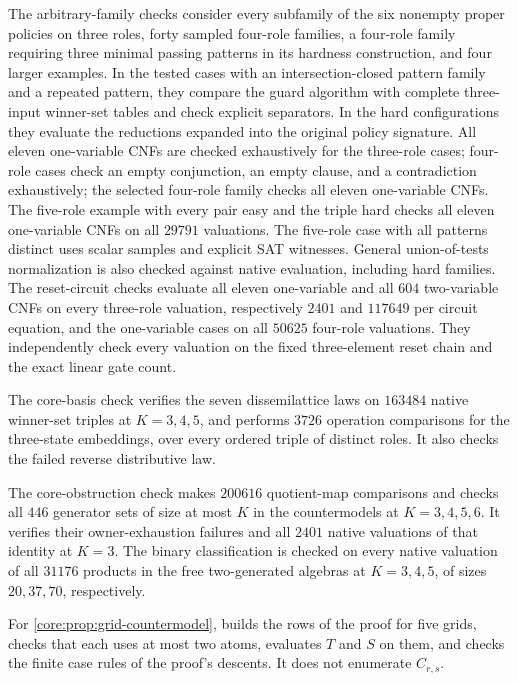 The arbitrary-family checks consider every subfamily of the six
nonempty proper policies on three roles, forty sampled four-role
families, a four-role family requiring three minimal passing patterns
in its hardness construction, and four larger examples. In the tested cases with an
intersection-closed pattern family and a repeated pattern, they compare
the guard algorithm with complete three-input winner-set tables and
check explicit separators. In the hard configurations they evaluate
the reductions expanded into the original policy signature. All eleven
one-variable CNFs are checked exhaustively for the three-role cases;
four-role cases check an empty conjunction, an empty clause, and a
contradiction exhaustively; the selected four-role family checks all
eleven one-variable CNFs. The five-role example with every pair easy
and the triple hard checks all eleven one-variable CNFs on all $29791$
valuations. The five-role case with all patterns distinct uses scalar
samples and explicit SAT witnesses. General union-of-tests normalization is also
checked against native evaluation, including hard families.
The reset-circuit checks evaluate all eleven one-variable and all
$604$ two-variable CNFs on every three-role valuation, respectively
$2401$ and $117649$ per circuit equation, and the one-variable cases
on all $50625$ four-role valuations. They independently check every
valuation on the fixed three-element reset chain and the exact linear
gate count.

The core-basis check verifies the seven dissemilattice laws on
$163484$ native winner-set triples at $K=3,4,5$, and performs
$3726$ operation comparisons for the three-state embeddings, over
every ordered triple of distinct roles. It also checks the failed
reverse distributive law.

The core-obstruction check makes $200616$ quotient-map comparisons
and checks all $446$ generator sets of size at most $K$ in the
countermodels at $K=3,4,5,6$. It verifies their owner-exhaustion failures
and all $2401$ native valuations of that identity at $K=3$.
The binary classification is checked on every native valuation of
all $31176$ products in the free two-generated algebras at $K=3,4,5$,
of sizes $20,37,70$, respectively.

For \cref{core:prop:grid-countermodel}, 
builds the rows of the proof for five grids, checks that each uses at most
two atoms, evaluates $T$ and $S$ on them, and checks the finite case rules
of the proof's descents. It does not enumerate $C_{r,s}$.

